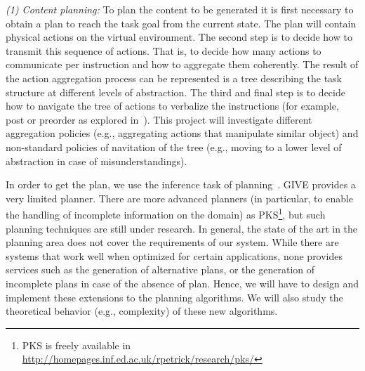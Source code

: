 \emph{(1) Content planning:} To plan the content to be generated it is first
necessary to obtain a plan to reach the task goal from the current state.
The plan will contain physical actions on the virtual environment. The second
step is to decide how to transmit this sequence of actions. That is, to decide
how many actions to communicate per instruction and how to aggregate them
coherently. The result of the action aggregation process can be represented is a
tree describing the task structure at different levels of abstraction. The third
and final step is to decide how to navigate the tree of actions to verbalize the
instructions (for example, post or preorder as
explored in~\cite{foster-etal-ijcai2009}). This project will investigate
different aggregation policies (e.g., aggregating actions that
manipulate similar object) and non-standard policies of navitation of the tree
(e.g., moving to a lower level of abstraction in case of misunderstandings).


In order to get the plan, we use the inference task of planning~\cite{nau04}.
GIVE provides a very limited planner. There are more advanced planners
(in particular, to enable the handling of incomplete information on the domain)
as PKS\footnote{PKS is freely available in
\url{http://homepages.inf.ed.ac.uk/rpetrick/research/pks/}},
but such planning techniques are still under research. In general,
the state of the art in the planning area does not cover the requirements of our
system. While there are systems that work well when optimized for certain
applications, none provides services such as the generation of alternative
plans, or the generation of incomplete plans in case of the absence of plan.
Hence, we will have to design and implement these extensions to the planning
algorithms. We will also study the theoretical behavior (e.g., complexity) of
these new algorithms. 

